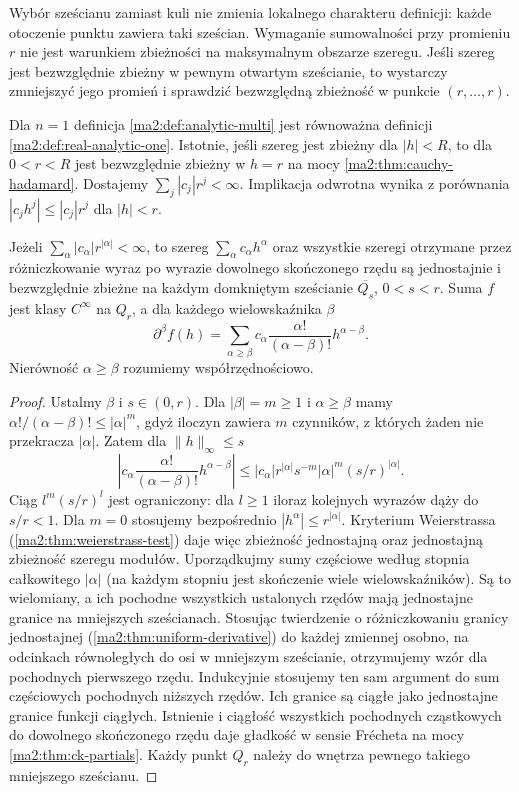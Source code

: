 Wybór sześcianu zamiast kuli nie zmienia
lokalnego charakteru definicji:
każde otoczenie punktu zawiera taki sześcian.
Wymaganie sumowalności przy promieniu $r$
nie jest warunkiem zbieżności na maksymalnym
obszarze szeregu. Jeśli szereg jest bezwzględnie
zbieżny w pewnym otwartym sześcianie,
to wystarczy zmniejszyć jego promień
i sprawdzić bezwzględną zbieżność
w punkcie $(r,\ldots,r)$.

Dla $n=1$ definicja \ref{ma2:def:analytic-multi}
jest równoważna definicji
\ref{ma2:def:real-analytic-one}.
Istotnie, jeśli szereg jest zbieżny dla
$|h|<R$, to dla $0<r<R$ jest bezwzględnie
zbieżny w $h=r$ na mocy
\ref{ma2:thm:cauchy-hadamard}.
Dostajemy $\sum_j|c_j|r^j<\infty$.
Implikacja odwrotna wynika z porównania
$|c_jh^j|\le |c_j|r^j$ dla $|h|<r$.

\begin{twierdzenie}
\label{ma2:thm:analytic-multi-derivative}
Jeżeli $\sum_\alpha |c_\alpha|r^{|\alpha|}<\infty$,
to szereg $\sum_\alpha c_\alpha h^\alpha$
oraz wszystkie szeregi otrzymane przez
różniczkowanie wyraz po wyrazie dowolnego
skończonego rzędu są jednostajnie
i bezwzględnie zbieżne na każdym domkniętym
sześcianie $\overline{Q_s}$, $0<s<r$.
Suma $f$ jest klasy $C^\infty$ na $Q_r$,
a dla każdego wielowskaźnika $\beta$
\[
 \partial^\beta f(h)=
 \sum_{\alpha\ge\beta} c_\alpha
 \frac{\alpha!}{(\alpha-\beta)!}h^{\alpha-\beta}.
\]
Nierówność $\alpha\ge\beta$ rozumiemy współrzędnościowo.
\end{twierdzenie}
\begin{proof}
Ustalmy $\beta$ i $s\in(0,r)$.
Dla $|\beta|=m\ge1$ i $\alpha\ge\beta$
mamy $\alpha!/(\alpha-\beta)!\le|\alpha|^m$,
gdyż iloczyn zawiera $m$ czynników,
z których żaden nie przekracza $|\alpha|$.
Zatem dla $\|h\|_\infty\le s$
\[
 \left|c_\alpha\frac{\alpha!}{(\alpha-\beta)!}
 h^{\alpha-\beta}\right|
 \le |c_\alpha|r^{|\alpha|}
 s^{-m}|\alpha|^m(s/r)^{|\alpha|}.
\]
Ciąg $l^m(s/r)^l$ jest ograniczony:
dla $l\ge1$ iloraz kolejnych wyrazów
dąży do $s/r<1$.
Dla $m=0$ stosujemy bezpośrednio
$|h^\alpha|\le r^{|\alpha|}$.
Kryterium Weierstrassa
(\ref{ma2:thm:weierstrass-test}) daje więc
zbieżność jednostajną oraz jednostajną
zbieżność szeregu modułów.
Uporządkujmy sumy częściowe według stopnia
całkowitego $|\alpha|$ (na każdym stopniu
jest skończenie wiele wielowskaźników).
Są to wielomiany, a ich pochodne
wszystkich ustalonych rzędów mają
jednostajne granice na mniejszych sześcianach.
Stosując twierdzenie o różniczkowaniu
granicy jednostajnej
(\ref{ma2:thm:uniform-derivative})
do każdej zmiennej osobno, na odcinkach
równoległych do osi w mniejszym sześcianie,
otrzymujemy wzór dla pochodnych pierwszego
rzędu. Indukcyjnie stosujemy ten sam argument
do sum częściowych pochodnych niższych rzędów.
Ich granice są ciągłe jako jednostajne granice
funkcji ciągłych. Istnienie i ciągłość wszystkich
pochodnych cząstkowych do dowolnego skończonego
rzędu daje gładkość w sensie Frécheta na mocy
\ref{ma2:thm:ck-partials}.
Każdy punkt $Q_r$ należy do wnętrza
pewnego takiego mniejszego sześcianu.
\end{proof}

